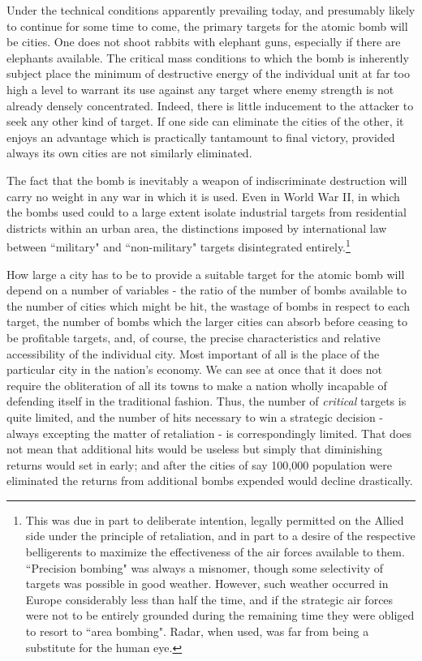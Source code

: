 \label{I-SuperiorNos1}

Under the technical conditions apparently prevailing today, and presumably likely to continue for some time to come, the primary targets for the atomic bomb will be cities. One does not shoot rabbits with elephant guns, especially if there are elephants available. The critical mass conditions to which the bomb is inherently subject place the minimum of destructive energy of the individual unit at far too high a level to warrant its use against any target where enemy strength is not already densely concentrated. Indeed, there is little inducement to the attacker to seek any other kind of target. If one side can eliminate the cities of the other, it enjoys an advantage which is practically tantamount to final victory, provided always its own cities are not similarly eliminated.

The fact that the bomb is inevitably a weapon of indiscriminate destruction will carry no weight in any war in which it is used. Even in World War II, in which the bombs used could to a large extent isolate industrial targets from residential districts within an urban area, the distinctions imposed by international law between ``military" and ``non-military" targets disintegrated entirely.\footnote{This was due in part to deliberate intention, legally permitted on the Allied side under the principle of retaliation, and in part to a desire of the respective belligerents to maximize the effectiveness of the air forces available to them. ``Precision bombing" was always a misnomer, though some selectivity of targets was possible in good weather. However, such weather occurred in Europe considerably less than half the time, and if the strategic air forces were not to be entirely grounded during the remaining time they were obliged to resort to ``area bombing". Radar, when used, was far from being a substitute for the human eye.}

How large a city has to be to provide a suitable target for the atomic bomb will depend on a number of variables - the ratio of the number of bombs available to the number of cities which might be hit, the wastage of bombs in respect to each target, the number of bombs which the larger cities can absorb before ceasing to be profitable targets, and, of course, the precise characteristics and relative accessibility of the individual city. Most important of all is the place of the particular city in the nation's economy. We can see at once that it does not require the obliteration of all its towns to make a nation wholly incapable of defending itself in the traditional fashion. Thus, the number of \emph{critical} targets is quite limited, and the number of hits necessary to win a strategic decision - always excepting the matter of retaliation - is correspondingly limited. That does not mean that additional hits would be useless but simply that diminishing returns would set in early; and after the cities of say 100,000 population were eliminated the returns from additional bombs expended would decline drastically.

